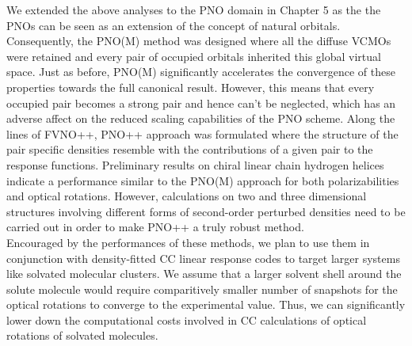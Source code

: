 We extended the above analyses to the PNO domain in Chapter 5 as the  
the PNOs can be seen as an extension of the concept of 
natural orbitals. Consequently, the PNO(M) method was designed where
all the diffuse VCMOs were retained and every pair of occupied orbitals
inherited this global virtual space. Just as before, PNO(M) significantly
accelerates the convergence of these properties towards the full
canonical result. However, this means that every occupied pair becomes a 
strong pair and hence can't be neglected, which has an adverse affect
on the reduced scaling capabilities of the PNO scheme. Along the 
lines of FVNO++, PNO++ approach was formulated where the structure of 
the pair specific densities resemble with the contributions of a given
pair to the response functions. Preliminary results on chiral linear chain 
hydrogen helices indicate a performance similar to the PNO(M) approach
for both polarizabilities and optical rotations. However, calculations on 
two and three dimensional structures involving different forms of second-order 
perturbed densities need to be carried out in order to make PNO++ a truly robust method. \\
Encouraged by the performances of these methods, we plan to use them in 
conjunction with density-fitted CC linear response codes\cite{Friese12} to target larger
systems like solvated molecular clusters. We assume that a larger solvent shell 
around the solute molecule would require comparitively smaller number of 
snapshots for the optical rotations to converge to the experimental value. Thus, we can significantly
lower down the computational costs involved in CC calculations of optical rotations
of solvated molecules.
